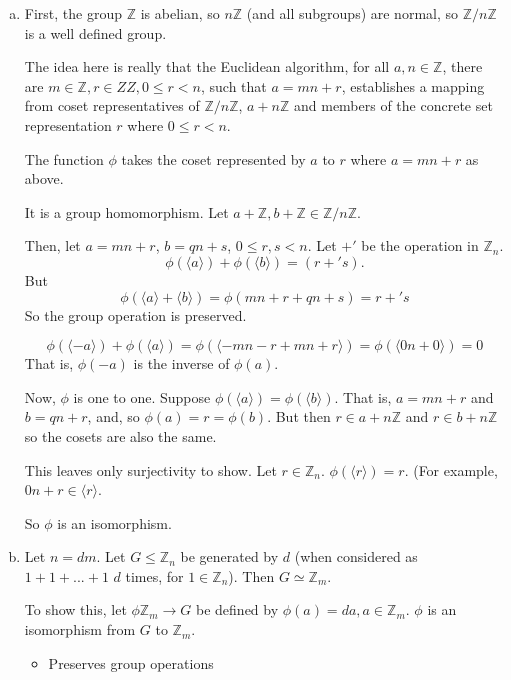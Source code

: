 \documentclass[11pt,oneside]{article}
\numberwithin{equation}{section}
\theoremstyle{definition}
\def\pmod{+'}
\def\ZZ{\mathbb{Z}}
\begin{document}
\begin{solution}
  \begin{enumerate}[(a)]
  \item
    First, the group $\ZZ$ is abelian, so $n\ZZ$ (and all subgroups)
    are normal, so $\ZZ / n\ZZ$ is a well defined group.  
    
    The idea here is really that the Euclidean algorithm, for all $a,
    n \in \ZZ$, there are $m \in \ZZ, r \in ZZ, 0 \leq r < n$, such
    that $ a = m n + r$, establishes a mapping from coset representatives of $ \ZZ / n\ZZ$,
    $a + n\ZZ$ and members of the concrete set representation $ r$ where $ 0 \leq r < n$.  
    
    The function $\phi$ takes the coset represented by $a$ to $r$ where $a = mn +r$ as above. 

    It is a group homomorphism.  Let $a + \ZZ, b + \ZZ \in \ZZ / n\ZZ$.

    Then, let $ a = mn + r$, $b = qn + s$, $ 0 \leq r, s < n$.  Let $\pmod$ be the operation in $\ZZ_n$. 
    $$
    \phi (\langle a \rangle) + \phi(\langle b \rangle) = (r \pmod s). 
    $$
    But
    $$ \phi(\langle a \rangle + \langle b \rangle ) = \phi (mn + r + qn + s) = r \pmod s
    $$
    So the group operation is preserved. 

    $$ \phi (\langle -a \rangle) + \phi (\langle a \rangle ) = \phi (\langle -mn - r + mn + r \rangle) = \phi(\langle 0n + 0 \rangle ) = 0
    $$
    That is, $\phi(-a)$ is the inverse of $\phi(a)$.

    Now, $\phi$ is one to one. Suppose $\phi(\langle a \rangle ) =
    \phi(\langle b \rangle )$.  That is, $a = mn +r$ and $b = qn + r$,
    and, so $\phi(a) = r = \phi(b)$. But then $r \in a + n\ZZ $ and $
    r \in b + n \ZZ$ so the cosets are also the same.

    This leaves only surjectivity to show.  Let $r \in \ZZ_n$.  $\phi(\langle r \rangle) = r$.  (For example,
    $0 n + r \in \langle r \rangle$.

    So $\phi$ is an isomorphism.  
    
  \item
    Let $n = d m$.  Let $G \leq \ZZ_n$ be generated by $d$ (when considered as 
    $1 + 1 + ... + 1$ $d$ times, for $1 \in \ZZ_n$).  Then $G \simeq \ZZ_m$.

    To show this, let $\phi \ZZ_m \to G$ be defined by $\phi(a) = da, a \in \ZZ_m$. $\phi$ is an
    isomorphism from $G$ to $\ZZ_m$.  

    \begin{itemize}
    \item
      Preserves group operations


\end{itemize}
\end{enumerate}
\end{solution}
\end{document}
